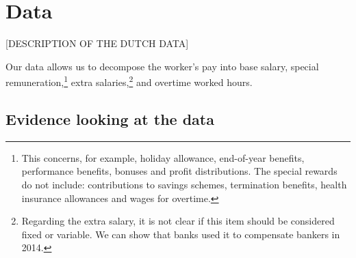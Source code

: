 \documentclass[12pt]{article}
\begin{document}
\newpage
\section{Data} \label{data}


[DESCRIPTION OF THE DUTCH DATA]

Our data allows us to decompose the worker's pay into base salary, special remuneration,\footnote{This concerns, for example, holiday allowance, end-of-year benefits, performance benefits, bonuses and profit distributions. The special rewards do not include: contributions to savings schemes, termination benefits, health insurance allowances and wages for overtime.} extra salaries,\footnote{Regarding the extra salary, it is not clear if this item should be considered fixed or variable. We can show that banks used it to compensate bankers in 2014.} and overtime worked hours. \\


\subsection{Evidence looking at the data}
	
\end{document}
